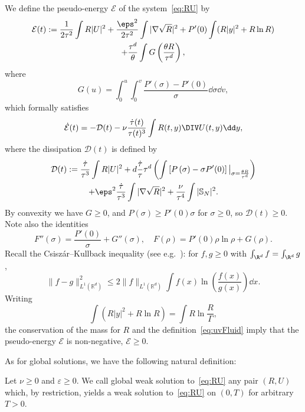 We define the pseudo-energy $\mathcal E$ of the system~\eqref{eq:RU} by
\begin{multline}\label{eq:pseudo-energy}
\mathcal E(t) := \frac{1}{2\tau^2}\int R|U|^2+\frac{\eps^2}{2\tau^2} \int|\nabla \sqrt R|^2 +P'(0)\int (R |y|^2 + R \ln R) \\
+ \frac{\tau^d}{\theta}\int G\left(\frac{\theta R}{\tau^d}\right),
\end{multline}
where
\begin{equation*}
G(u) =\int_0^u\int_0^v \frac{P'(\sigma)-P'(0)}{\sigma} \dd \sigma \dd v,
\end{equation*}
which formally satisfies
\begin{equation}\label{eq:evol-pseudo}
\dot{\mathcal E}(t) =- \mathcal D(t) - \nu \frac{\dot
\tau(t)}{\tau(t)^3} \int R(t,y) \DIV U(t,y)\dd y,
\end{equation}
where the dissipation $\mathcal D(t) $ is defined by
\begin{multline}\label{eq:dissip-pseudo}
\mathcal D(t) := \frac{\dot \tau}{\tau^3}\int R |U|^2 + d\frac{\dot \tau}{\tau} \tau^d \left(\int \left[P\left(\sigma\right) -\sigma P'(0) \right] \big|_{\sigma= \frac{ \theta R}{\tau^d}} \right) \\
+\eps^2 \frac{\dot \tau}{\tau^3} \int |\nabla \sqrt R|^2 + \frac{\nu}{\tau^4} \int |\mathbb S_N|^2.
\end{multline}
By convexity we have $G\ge 0$, and $P(\sigma)\ge P'(0)\sigma$ for $\sigma\ge 0$, so $\mathcal D(t)\ge 0$. Note also the identities
\begin{equation}\label{eq:FG}
F''(\sigma) = \frac{P'(0)}{\sigma}+G''(\sigma),\quad F(\rho) = P'(0)\rho\ln \rho + G(\rho).
\end{equation}
Recall the Csisz\'ar--Kullback inequality (see e.g.~\cite[Theorem~8.2.7]{LogSob}): for $f,g\ge 0$ with $\int_{\R^d} f=\int_{\R^d} g$,
\begin{equation*}
\|f-g\|_{L^1({\mathbb R}^d)}^2\le 2 \|f\|_{L^1({\mathbb R}^d)}\int f(x)\ln \left(\frac{f(x)}{g(x)}\right) \dd x.
\end{equation*}
Writing
\[
\int (R |y|^2 + R \ln R) = \int R \ln \frac{R}{\Gamma},
\]
the conservation of the mass for $R$ and the definition~\eqref{eq:uvFluid} imply that the pseudo-energy $\mathcal E$ is non-negative, $\mathcal E\ge 0$.

As for global solutions, we have the following natural definition:

\begin{defi}\label{def:sol-globale}
Let $\nu \ge 0$ and $\varepsilon \ge 0.$ We call global weak solution to~\eqref{eq:RU} any pair $(R,U)$ which, by restriction, yields a weak solution to~\eqref{eq:RU} on $(0,T)$ for arbitrary $T>0.$
\end{defi}

